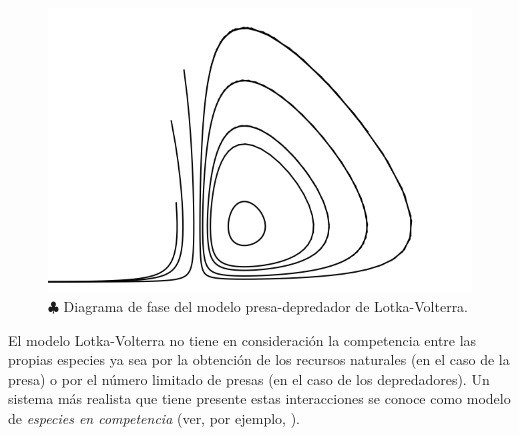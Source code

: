 \begin{example}
\begin{figure}[!ht] \centering
	\includegraphics[scale=0.5]{figures/lotkavolterra.png}
	\caption{$\clubsuit$ Diagrama de fase del modelo presa-depredador de Lotka-Volterra.}
	\label{fig:lotkavolterra}
\end{figure}

El modelo Lotka-Volterra no tiene en consideración la competencia entre las propias especies ya sea por la obtención de los recursos naturales (en el caso de la presa) o por el número limitado de presas (en el caso de los depredadores). Un sistema más realista que tiene presente estas interacciones se conoce como modelo de \emph{especies en competencia} (ver, por ejemplo, \cite[p.~171]{dynandbif}).

\end{example}

